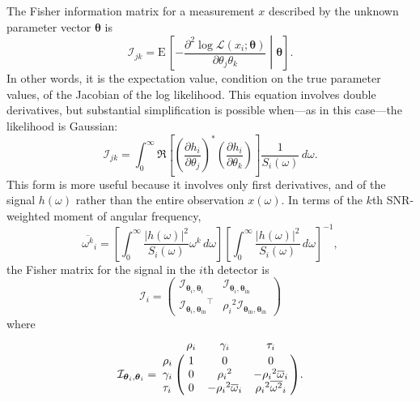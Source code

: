 \documentclass{iopart}
\begin{document}
The Fisher information matrix for a measurement $x$ described by the unknown parameter vector $\boldsymbol{\theta}$ is
%
\begin{equation}\label{eq:general-fisher-matrix}
    \mathcal{I}_{jk} = \mathrm{E} \, \left[
        -\frac{\partial^2 \log
            \mathcal{L}(x_i ; \boldsymbol\theta)}
            {\partial \theta_j \theta_k}
    \middle| \boldsymbol\theta
    \right].
\end{equation}
%
In other words, it is the expectation value, condition on the true parameter values, of the Jacobian of the log likelihood. This equation involves double derivatives, but substantial simplification is possible when---as in this case---the likelihood is Gaussian:
%
\begin{equation}\label{eq:gaussian-fisher-matrix}
    \mathcal{I}_{jk} = \int_0^\infty \Re \left[
        \left(\frac{\partial h_i}{\partial \theta_j}\right)^*
        \left(\frac{\partial h_i}{\partial \theta_k}\right)
    \right] \frac{1}{S_i(\omega)} \, d\omega.
\end{equation}
%
This form is more useful because it involves only first derivatives, and of the signal $h (\omega)$ rather than the entire observation $x (\omega)$. In terms of the $k$th \ac{SNR}-weighted moment of angular frequency,
%
\begin{equation}\label{eq:angular-frequency-moments}
    {\overline{\omega^k}}_i =
        \left[ \int_0^\infty \frac{|h (\omega)|^2}{S_i(\omega)} \omega^k \, d\omega \right]
        \left[ \int_0^\infty \frac{|h (\omega)|^2}{S_i(\omega)} \, d\omega \right]^{-1},
\end{equation}
%
the Fisher matrix for the signal in the $i$th detector is
%
\begin{equation}
    \mathcal{I}_i = \left(
        \begin{array}{cc}
            \mathcal{I}_{\boldsymbol\theta_i,\boldsymbol\theta_i} &
            \mathcal{I}_{\boldsymbol\theta_i,\boldsymbol\theta_\mathrm{in}} \\
            {\mathcal{I}_{\boldsymbol\theta_i,\boldsymbol\theta_\mathrm{in}}}^\intercal &
            {\rho_i}^2 \mathcal{I}_{\boldsymbol\theta_\mathrm{in},\boldsymbol\theta_\mathrm{in}}
        \end{array}
    \right)
\end{equation}
%
where
%
\begin{equation}\label{eq:fisher-matrix}
    \mathcal{I}_{\boldsymbol\theta_i,\boldsymbol\theta_i} = \bordermatrix{
        ~ & \rho_i & \gamma_i & \tau_i \cr
        \rho_i & 1 & 0 & 0 \cr
        \gamma_i & 0 & {\rho_i}^2 & -{\rho_i}^2 {\overline{\omega}}_i \cr
        \tau_i & 0 & -{\rho_i}^2 {\overline{\omega}}_i & {\rho_i}^2 {\overline{\omega^2}}_i
    }.
\end{equation}
\end{document}
